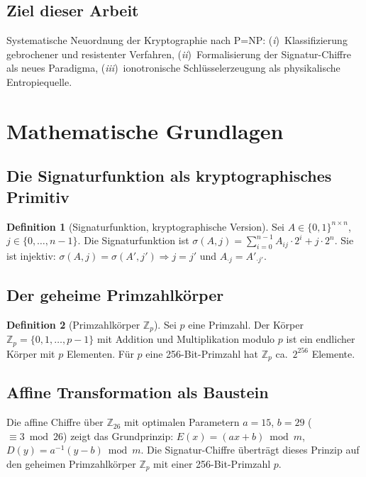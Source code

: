 ﻿\documentclass[a4paper,12pt]{scrreprt}
\theoremstyle{definition}
\newtheorem{definition}{Definition}[section]
\begin{document}
\subsection{Ziel dieser Arbeit}

Systematische Neuordnung der Kryptographie nach P=NP:
(\textit{i})~Klassifizierung gebrochener und resistenter Verfahren,
(\textit{ii})~Formalisierung der Signatur-Chiffre als neues Paradigma,
(\textit{iii})~ionotronische Schlüsselerzeugung als physikalische
Entropiequelle.

\section{Mathematische Grundlagen}

\subsection{Die Signaturfunktion als kryptographisches Primitiv}

\begin{definition}[Signaturfunktion, kryptographische Version]
  Sei $A \in \{0,1\}^{n\times n}$, $j\in\{0,\ldots,n-1\}$. Die
  Signaturfunktion ist
  $\sigma(A,j) = \sum_{i=0}^{n-1} A_{ij} \cdot 2^i + j \cdot 2^n.$
  Sie ist injektiv: $\sigma(A,j) = \sigma(A',j') \Rightarrow
  j=j'$ und $A_{\cdot j} = A'_{\cdot j'}$.
\end{definition}

\subsection{Der geheime Primzahlkörper}

\begin{definition}[Primzahlkörper $\mathbb{Z}_p$]
  Sei $p$ eine Primzahl. Der Körper $\mathbb{Z}_p = \{0,1,\ldots,p-1\}$
  mit Addition und Multiplikation modulo $p$ ist ein endlicher Körper
  mit $p$ Elementen. Für $p$ eine 256-Bit-Primzahl hat $\mathbb{Z}_p$
  ca.\ $2^{256}$ Elemente.
\end{definition}

\subsection{Affine Transformation als Baustein}

Die affine Chiffre über $\mathbb{Z}_{26}$ mit optimalen Parametern
$a=15$, $b=29$ ($\equiv 3 \bmod 26$) zeigt das Grundprinzip:
$E(x) = (ax+b)\bmod m$,\; $D(y) = a^{-1}(y-b)\bmod m$.
Die Signatur-Chiffre überträgt dieses Prinzip auf den geheimen
Primzahlkörper $\mathbb{Z}_p$ mit einer 256-Bit-Primzahl $p$.
\end{document}

